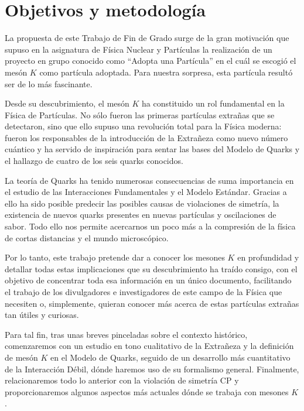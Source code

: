 \chapter*{Objetivos y metodología}
\label{cap:objetivos}

La propuesta de este Trabajo de Fin de Grado surge de la gran motivación que supuso en la asignatura de Física Nuclear y Partículas la realización de un proyecto en grupo conocido como ``Adopta una Partícula'' en el cuál se escogió el mesón $K$ como partícula adoptada. Para nuestra sorpresa, esta partícula resultó ser de lo más fascinante.

Desde su descubrimiento, el mesón $K$ ha constituido un rol fundamental en la Física de Partículas. No sólo fueron las primeras partículas extrañas que se detectaron, sino que ello supuso una revolución total para la Física moderna: fueron los responsables de la introducción de la Extrañeza como nuevo número cuántico y ha servido de inspiración para sentar las bases del Modelo de Quarks y el hallazgo de cuatro de los seis quarks conocidos.

La teoría de Quarks ha tenido numerosas consecuencias de suma importancia en el estudio de las Interacciones Fundamentales y el Modelo Estándar. Gracias a ello ha sido posible predecir las posibles causas de violaciones de simetría, la existencia de nuevos quarks presentes en nuevas partículas y oscilaciones de sabor. Todo ello nos permite acercarnos un poco más a la compresión de la física de cortas distancias y el mundo microscópico. 

Por lo tanto, este trabajo pretende dar a conocer los mesones $K$ en profundidad y detallar todas estas implicaciones que su descubrimiento ha traído consigo, con el objetivo de concentrar toda esa información en un único documento, facilitando el trabajo de los divulgadores e investigadores de este campo de la Física que necesiten o, simplemente, quieran conocer más acerca de estas partículas extrañas tan útiles y curiosas.

Para tal fin, tras unas breves pinceladas sobre el contexto histórico, comenzaremos con un estudio en tono cualitativo de la Extrañeza y la definición de mesón $K$ en el Modelo de Quarks, seguido de un desarrollo más cuantitativo de la Interacción Débil, dónde haremos uso de su formalismo general. Finalmente, relacionaremos todo lo anterior con la violación de simetría CP y proporcionaremos algunos aspectos más actuales dónde se trabaja con mesones $K$.



